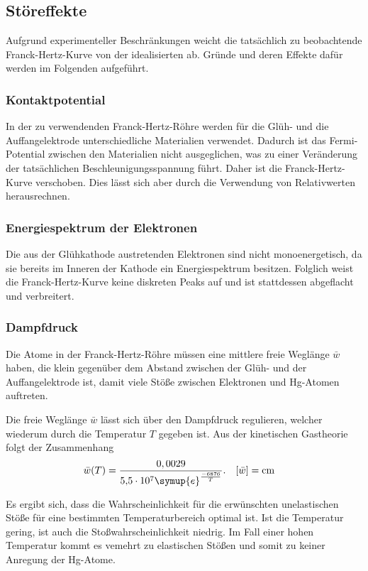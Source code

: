 \subsection{Störeffekte}
\label{sec:Störeffekte}
Aufgrund experimenteller Beschränkungen weicht die tatsächlich zu beobachtende Franck-Hertz-Kurve von der idealisierten ab. 
Gründe und deren Effekte dafür werden im Folgenden aufgeführt.

\subsubsection{Kontaktpotential}
In der zu verwendenden Franck-Hertz-Röhre werden für die Glüh- und die Auffangelektrode unterschiedliche Materialien verwendet. 
Dadurch ist das Fermi-Potential zwischen den Materialien nicht ausgeglichen, was zu einer Veränderung der tatsächlichen 
Beschleunigungsspannung führt. Daher ist die Franck-Hertz-Kurve verschoben. Dies lässt sich aber durch die Verwendung von 
Relativwerten herausrechnen.

\subsubsection{Energiespektrum der Elektronen}
Die aus der Glühkathode austretenden Elektronen sind nicht monoenergetisch, da sie bereits im Inneren der Kathode ein Energiespektrum 
besitzen. Folglich weist die Franck-Hertz-Kurve keine diskreten Peaks auf und ist stattdessen abgeflacht und verbreitert.

\subsubsection{Dampfdruck}
Die Atome in der Franck-Hertz-Röhre müssen eine mittlere freie Weglänge $\bar{w}$ haben, die klein gegenüber dem Abstand zwischen 
der Glüh- und der Auffangelektrode ist, damit viele Stöße zwischen Elektronen und Hg-Atomen auftreten.

Die freie Weglänge $\bar{w}$ lässt sich über den Dampfdruck regulieren, welcher wiederum durch die Temperatur $T$ gegeben 
ist. Aus der kinetischen Gastheorie folgt der Zusammenhang
\begin{align}
    \bar{w}(T) &= \frac{0,0029}{\num{5.5e7} \symup{e}^{\frac{-6876}{T}}}. & [\bar{w}] &= \unit{\centi\metre} \label{eq:freie weglänge} %
\end{align}

Es ergibt sich, dass die Wahrscheinlichkeit für die erwünschten unelastischen Stöße für eine bestimmten Temperaturbereich optimal ist. Ist 
die Temperatur gering, ist auch die Stoßwahrscheinlichkeit niedrig. Im Fall einer hohen Temperatur kommt es vemehrt zu elastischen Stößen 
und somit zu keiner Anregung der Hg-Atome.